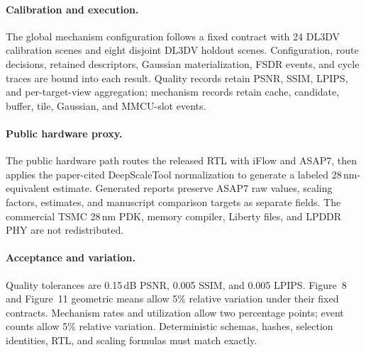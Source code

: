 \paragraph{Calibration and execution.}
The global mechanism configuration follows a fixed contract with 24 DL3DV
calibration scenes and eight disjoint DL3DV holdout scenes. Configuration,
route decisions, retained descriptors, Gaussian materialization, FSDR events,
and cycle traces are bound into each result. Quality records retain PSNR, SSIM,
LPIPS, and per-target-view aggregation; mechanism records retain cache,
candidate, buffer, tile, Gaussian, and MMCU-slot events.

\paragraph{Public hardware proxy.}
The public hardware path routes the released RTL with iFlow and ASAP7, then
applies the paper-cited DeepScaleTool normalization to generate a labeled
28\,nm-equivalent estimate. Generated reports preserve ASAP7 raw values,
scaling factors, estimates, and manuscript comparison targets as separate
fields. The commercial TSMC 28\,nm PDK, memory compiler, Liberty files, and
LPDDR PHY are not redistributed.

\paragraph{Acceptance and variation.}
Quality tolerances are 0.15\,dB PSNR, 0.005 SSIM, and 0.005 LPIPS. Figure~8
and Figure~11 geometric means allow 5\% relative variation under their fixed
contracts. Mechanism rates and utilization allow two percentage points; event
counts allow 5\% relative variation. Deterministic schemas, hashes, selection
identities, RTL, and scaling formulas must match exactly.
